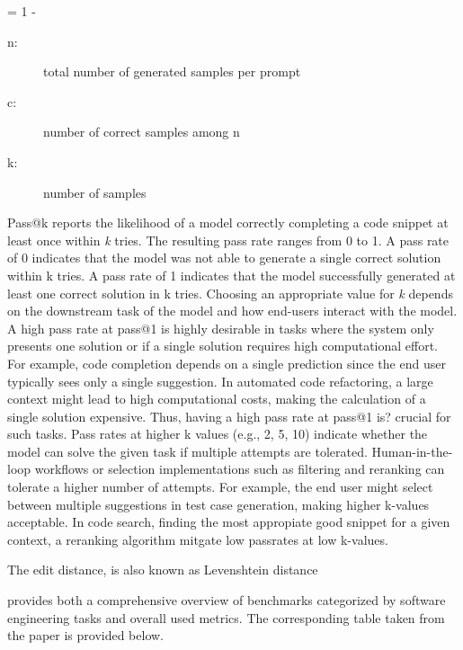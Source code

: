 \documentclass[11pt]{article}
\begin{document}
 = 1 - 
\begin{description}
    \item[n:] total number of generated samples per prompt
    \item[c:] number of correct samples among  n
    \item[k:] number of samples
\end{description}

Pass@k reports the likelihood of a model correctly completing a code snippet at least once within \emph{k} tries.
The resulting pass rate ranges from 0 to 1.
A pass rate of 0 indicates that the model was not able to generate a single correct solution within k tries.
A pass rate of 1 indicates that the model successfully generated at least one correct solution in k tries.
Choosing an appropriate value for \emph{k} depends on the downstream task of the model and how end-users interact with the model.
A high pass rate at pass@1 is highly desirable in tasks where the system only presents one solution or if a single solution requires high computational effort.
For example, code completion depends on a single prediction since the end user typically sees only a single suggestion.
In automated code refactoring, a large context might lead to high computational costs, making the calculation of a single solution expensive.
Thus, having a high pass rate at pass@1 is? crucial for such tasks.
Pass rates at higher k values (e.g., 2, 5, 10) indicate whether the model can solve the given task if multiple attempts are tolerated.
Human-in-the-loop workflows or selection implementations such as filtering and reranking can tolerate a higher number of attempts.
For example, the end user might select between multiple suggestions in test case generation, making higher k-values acceptable.
In code search, finding the most appropiate good snippet for a given context, a reranking algorithm mitgate low passrates at low k-values.

The edit distance, is also known as Levenshtein distance

\cite{10.1145/3695988} provides both a comprehensive overview of benchmarks categorized by software engineering tasks and overall used metrics.
The corresponding table taken from the paper is provided below.

\subsection{}
\end{document}
